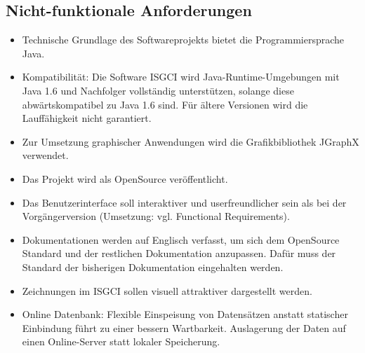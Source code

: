 \documentclass[10pt,a4paper]{article}
\begin{document}
	
	\subsection{Nicht-funktionale Anforderungen} %
		\begin{itemize}
		\item Technische Grundlage des Softwareprojekts bietet die Programmiersprache Java.
		\item Kompatibilität: Die Software ISGCI wird Java-Runtime-Umgebungen mit Java 1.6 und Nachfolger vollständig unterstützen, solange diese abwärtskompatibel zu Java 1.6 sind. Für ältere Versionen wird die Lauffähigkeit nicht garantiert.
		\item Zur Umsetzung graphischer Anwendungen wird die Grafikbibliothek JGraphX verwendet.
		\item Das Projekt wird als OpenSource veröffentlicht.
		\item Das Benutzerinterface soll interaktiver und userfreundlicher sein als bei der Vorgängerversion (Umsetzung: vgl. Functional Requirements).
		\item Dokumentationen werden auf Englisch verfasst, um sich dem OpenSource Standard und der restlichen Dokumentation anzupassen. Dafür muss der Standard der bisherigen Dokumentation eingehalten werden.
		\item Zeichnungen im ISGCI sollen visuell attraktiver dargestellt werden.
		\item Online Datenbank: Flexible Einspeisung von Datensätzen anstatt statischer Einbindung führt zu einer bessern Wartbarkeit. Auslagerung der Daten auf einen Online-Server statt lokaler Speicherung.
		\end{itemize}
		
\end{document}
